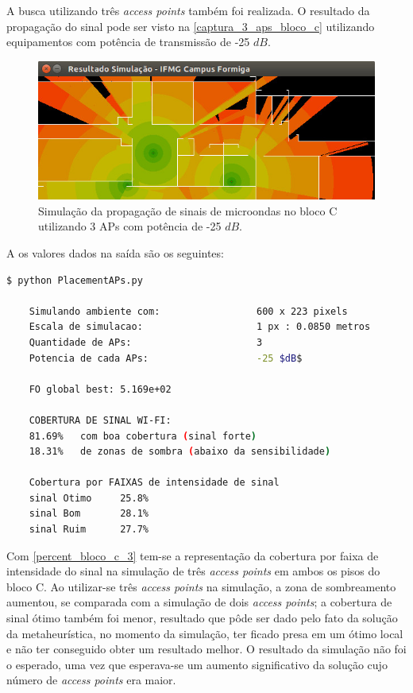 \documentclass[
	12pt,				%
	twoside,			%
	a4paper,			%
	english,			%
	french,				%
	spanish,			%
	brazil				%
	]{abntex2}
\begin{document}
A busca utilizando três \emph{access points} também foi realizada. O
resultado da propagação do sinal pode ser visto na
\autoref{captura_3_aps_bloco_c} utilizando equipamentos com potência de
transmissão de -25 \(dB\).

\begin{figure}[ht]
    \caption{\label{captura_3_aps_bloco_c} Simulação da propagação de sinais de microondas no bloco C utilizando 3 APs com potência de -25 $dB$.
    }
    \begin{center}
        \includegraphics[scale=0.7]{imagens/captura-3-aps-bloco-c.jpg}
    \end{center}
\end{figure}

A os valores dados na saída são os seguintes:

\begin{lstlisting}[language=bash]
    $ python PlacementAPs.py 
    
    Simulando ambiente com:                 600 x 223 pixels
    Escala de simulacao:                    1 px : 0.0850 metros
    Quantidade de APs:                      3
    Potencia de cada APs:                   -25 $dB$
    
    FO global best: 5.169e+02
    
    COBERTURA DE SINAL WI-FI:
    81.69%   com boa cobertura (sinal forte)
    18.31%   de zonas de sombra (abaixo da sensibilidade)
    
    Cobertura por FAIXAS de intensidade de sinal
    sinal Otimo     25.8%
    sinal Bom       28.1%
    sinal Ruim      27.7%
\end{lstlisting}

Com \autoref{percent_bloco_c_3} tem-se a representação da cobertura por
faixa de intensidade do sinal na simulação de três \emph{access points}
em ambos os pisos do bloco C. Ao utilizar-se três \emph{access points}
na simulação, a zona de sombreamento aumentou, se comparada com a
simulação de dois \emph{access points}; a cobertura de sinal ótimo
também foi menor, resultado que pôde ser dado pelo fato da solução da
metaheurística, no momento da simulação, ter ficado presa em um ótimo
local e não ter conseguido obter um resultado melhor. O resultado da
simulação não foi o esperado, uma vez que esperava-se um aumento
significativo da solução cujo número de \emph{access points} era maior.
\end{document}
